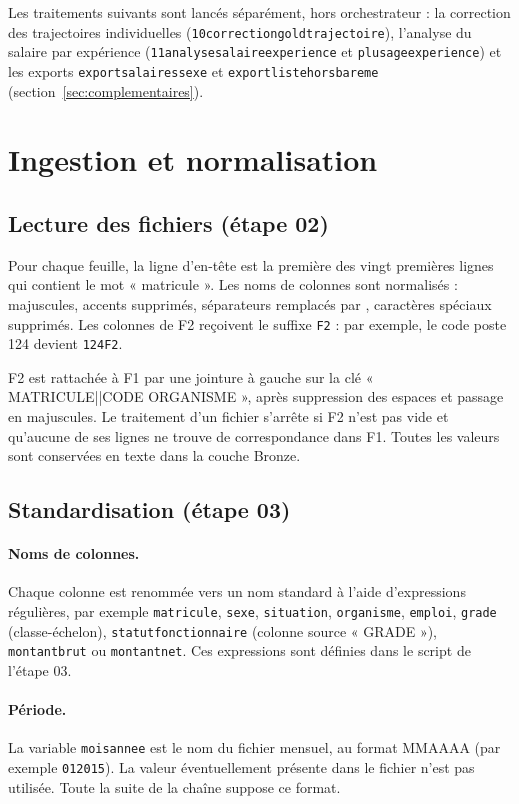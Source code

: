 \documentclass[12pt,a4paper,french]{article}
\renewcommand{\_}{\underscoreorigine\allowbreak}
\begin{document}
Les traitements suivants sont lancés séparément, hors orchestrateur : la correction des trajectoires individuelles (\texttt{10\_correction\_gold\_trajectoire}), l'analyse du salaire par expérience (\texttt{11\_analyse\_salaire\_experience} et \texttt{plus\_age\_experience}) et les exports \texttt{export\_salaires\_sexe} et \texttt{export\_liste\_hors\_bareme} (section~\ref{sec:complementaires}).

\section{Ingestion et normalisation}

\subsection{Lecture des fichiers (étape 02)}

Pour chaque feuille, la ligne d'en-tête est la première des vingt premières lignes qui contient le mot « matricule ». Les noms de colonnes sont normalisés : majuscules, accents supprimés, séparateurs remplacés par \texttt{\_}, caractères spéciaux supprimés. Les colonnes de F2 reçoivent le suffixe \texttt{\_F2} : par exemple, le code poste 124 devient \texttt{124\_F2}.

F2 est rattachée à F1 par une jointure à gauche sur la clé « MATRICULE||CODE ORGANISME », après suppression des espaces et passage en majuscules. Le traitement d'un fichier s'arrête si F2 n'est pas vide et qu'aucune de ses lignes ne trouve de correspondance dans F1. Toutes les valeurs sont conservées en texte dans la couche Bronze.

\subsection{Standardisation (étape 03)}

\paragraph{Noms de colonnes.} Chaque colonne est renommée vers un nom standard à l'aide d'expressions régulières, par exemple \texttt{matricule}, \texttt{sexe}, \texttt{situation}, \texttt{organisme}, \texttt{emploi}, \texttt{grade} (classe-échelon), \texttt{statut\_fonctionnaire} (colonne source « GRADE »), \texttt{montant\_brut} ou \texttt{montant\_net}. Ces expressions sont définies dans le script de l'étape 03.

\paragraph{Période.} La variable \texttt{mois\_annee} est le nom du fichier mensuel, au format MMAAAA (par exemple \texttt{012015}). La valeur éventuellement présente dans le fichier n'est pas utilisée. Toute la suite de la chaîne suppose ce format.
\end{document}
